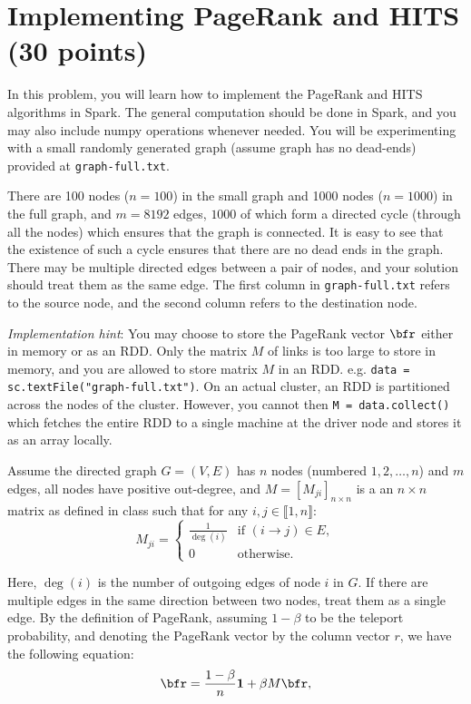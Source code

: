\section{Implementing PageRank and HITS (30 points)}
In this problem, you will learn how to implement the PageRank and HITS
algorithms in Spark. The general computation should be done in Spark, and you may also include numpy operations whenever needed. You will be experimenting with a small randomly generated graph
(assume graph has no dead-ends) provided at \texttt{graph-full.txt}.

There are 100 nodes ($n=100$) in the small graph and 1000 nodes ($n=1000$) in the full graph, and $m=8192$ edges, $1000$ of
which form a directed cycle (through all the nodes) which ensures that the
graph is connected. It is easy to see that the existence of such a cycle
ensures that there are no dead ends in the graph. There may be multiple
directed edges between a pair of nodes, and your solution should treat them as
the same edge.  The first column in \texttt{graph-full.txt} refers to the
source node, and the second column refers to the destination node.

\textit{Implementation hint}: You may choose to store the PageRank vector $\bfr$  either in memory or as an RDD.  Only the matrix $M$ of links is too large to store in memory, and you are allowed to store matrix $M$ in an RDD. e.g. \lstinline{data = sc.textFile("graph-full.txt")}. On an actual cluster, an RDD is partitioned across the nodes of the cluster. However, you cannot then \lstinline{M = data.collect()} which fetches the entire RDD to a single machine at the driver node and stores it as an array locally.

Assume the directed graph $G=(V,E)$ has $n$ nodes (numbered $1,2, \ldots, n$)
and $m$ edges, all nodes have positive out-degree, and $M=[M_{ji}]_{n\times n}$
is a an $n\times n$ matrix as defined in class such that for any $i,j \in
\llbracket 1, n\rrbracket$:
\[
	M_{ji} =
	\left\{
		\begin{array}{cl}
			\frac{1}{\deg(i)}	& \text{if } (i\to j)\in E, \\
			0									& \text{otherwise}.
		\end{array}
	\right.
\]

Here, $\deg(i)$ is the number of outgoing edges of node $i$ in $G$. If there
are multiple edges in the same direction between two nodes, treat them as a
single edge. By the definition of PageRank, assuming $1-\beta$ to be the
teleport probability, and denoting the PageRank vector by the column vector
$r$, we have the following equation:
\begin{equation}\label{PageRankDefn}
	\bfr = \frac{1-\beta}{n}{\mathbf{1}} + \beta M\bfr,
\end{equation}


